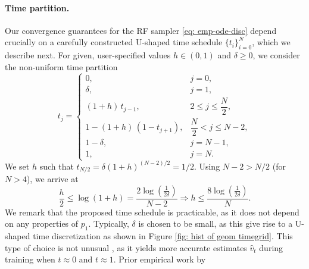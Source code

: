 \documentclass{article}
\theoremstyle{plain}
\theoremstyle{definition}
\theoremstyle{remark}
\begin{document}
\paragraph{Time partition.} Our convergence guarantees for the RF sampler \eqref{eq: emp-ode-disc} depend crucially on a carefully constructed U-shaped time schedule $\{t_i\}_{i = 0}^N$, which we describe next.
For given, user-specified values $h\in (0,1)$ and $\delta \ge 0$, we consider the non-uniform time partition 
\begin{equation}
\label{eq: gemoetric time discretization}
t_j =
\begin{cases}
0, & j = 0, \\[4pt]
\delta, & j = 1, \\[6pt]
(1+h)\, t_{j-1}, & 2 \le j \le \dfrac{N}{2}, \\[8pt]
1 - (1+h)\,(1 - t_{j+1}), & \dfrac{N}{2} < j \le N-2, \\[6pt]
1 - \delta, & j = N-1, \\[6pt]
1, & j = N .
\end{cases}
\end{equation}
 We set $h$ such that $t_{N/2} = \delta (1+h)^{(N-2)/2} = 1/2$. Using $N-2 > N/2$ (for $N>4$), we arrive at 
\begin{equation}
\label{eq: value of h}
\frac{h}{2} \le \log(1+h) = \frac{2\log (\frac{1}{2 \delta})}{N-2} \Rightarrow  h \le \frac{8 \log (\frac{1}{2 \delta})}{N}.
\end{equation}
 We remark that the proposed time schedule is practicable, as it does not depend on any properties of $p_1$.
Typically, $\delta$ is chosen to be small, as
this give rise to a U-shaped time discretization as shown in Figure \ref{fig: hist of geom timegrid}.  This type of choice is not unusual \cite{lee2024improvingtrainingrectifiedflows}, as it yields more accurate estimates  $\widehat v_t$ during training when $t \approx 0$ and $t \approx 1$. Prior empirical work by %
\end{document}
